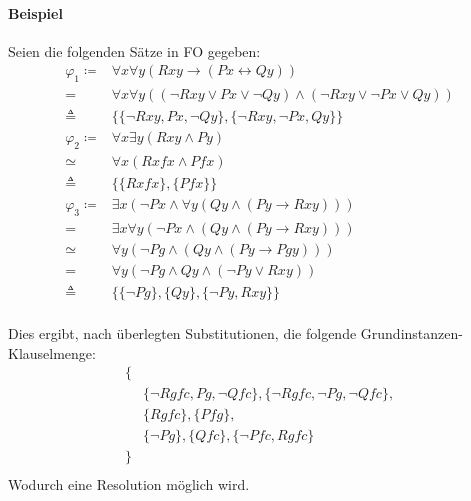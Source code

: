 			\paragraph{Beispiel}
				Seien die folgenden Sätze in FO gegeben:
				\begin{align*}
					\varphi _ 1 \coloneqq & \forall x \forall y (Rxy \rightarrow (Px \leftrightarrow Qy))                                   \\
					=                     & \forall x \forall y ((\lnot Rxy \lor Px \lor \lnot Qy) \land (\lnot Rxy \lor \lnot Px \lor Qy)) \\
					\triangleq            & \{ \{ \lnot Rxy, Px, \lnot Qy \}, \{ \lnot Rxy, \lnot Px, Qy \} \}                              \\
					\varphi _ 2 \coloneqq & \forall x \exists y (Rxy \land Py)                                                              \\
					\simeq                & \forall x (Rxfx \land Pfx)                                                                      \\
					\triangleq            & \{ \{ Rxfx \}, \{ Pfx \} \}                                                                     \\
					\varphi _ 3 \coloneqq & \exists x (\lnot Px \land \forall y (Qy \land (Py \rightarrow Rxy)))                            \\
					=                     & \exists x \forall y (\lnot Px \land (Qy \land (Py \rightarrow Rxy)))                            \\
					\simeq                & \forall y (\lnot Pg \land (Qy \land (Py \rightarrow Pgy)))                                      \\
					=                     & \forall y (\lnot Pg \land Qy \land (\lnot Py \lor Rxy))                                         \\
					\triangleq            & \{ \{ \lnot Pg \}, \{ Qy \}, \{ \lnot Py, Rxy \} \}                                             \\
				\end{align*}

				Dies ergibt, nach überlegten Substitutionen, die folgende Grundinstanzen-Klauselmenge:
				\begin{align*}
					\{ &                                                                         \\
					   & \{ \lnot Rgfc, Pg, \lnot Qfc \}, \{ \lnot Rgfc, \lnot Pg, \lnot Qfc \}, \\
					   & \{ Rgfc \}, \{ Pfg \},                                                  \\
					   & \{ \lnot Pg \}, \{ Qfc \}, \{ \lnot Pfc, Rgfc \}                        \\
					\} &                                                                         \\
				\end{align*}
				Wodurch eine Resolution möglich wird.

